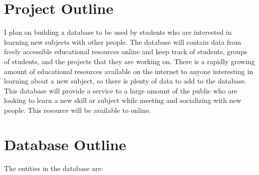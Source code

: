 \documentclass[12pt]{article}
\begin{document}
\maketitle

\section{Project Outline}
I plan on building a database to be used by students who are interested in learning new subjects with other people. The database will contain data from freely accessible educational resources online and keep track of students, groups of students, and the projects that they are working on. There is a rapidly growing amount of educational resources available on the internet to anyone interesting in learning about a new subject, so there is plenty of data to add to the database. This database will provide a service to a large amount of the public who are looking to learn a new skill or subject while meeting and socializing with new people. This resource will be available to online. 

\section{Database Outline}

The entities in the database are:
\end{document}
